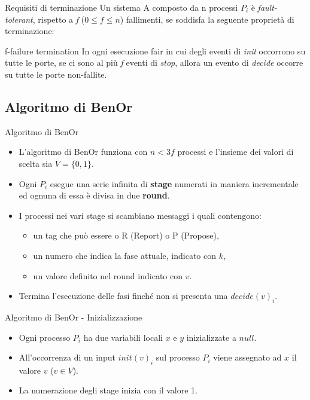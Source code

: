 \documentclass{beamer}
\begin{document}
\begin{frame}{Requisiti di terminazione}
    Un sistema A composto da n processi $P_{i}$ è \textit{fault-tolerant}, rispetto a \textit{f} ($0 \leq f \leq n$) fallimenti, se soddisfa la seguente proprietà di terminazione: 
    \begin{block}{f-failure termination}
    In ogni esecuzione fair in cui degli eventi di \textit{init} occorrono su tutte le porte, se ci sono al più \textit{f} eventi di \textit{stop}, allora un evento di \textit{decide} occorre su tutte le porte non-fallite. 
    \end{block}
\end{frame}


\subsection{Algoritmo di BenOr}
\begin{frame}{Algoritmo di BenOr}
    \begin{itemize}
        \item L'algoritmo di BenOr funziona con $n < 3f$ processi e l'insieme dei valori di scelta sia $V = \{0, 1\}$.
        
        \item Ogni $P_{i}$ esegue una serie infinita di \textbf{stage} numerati in maniera incrementale ed ognuna di essa è divisa in due \textbf{round}.
        
        \item I processi nei vari stage si scambiano messaggi i quali contengono:
            \begin{itemize}
                \item un tag che può essere o R (Report) o P (Propose),
                \item un numero che indica la fase attuale, indicato con $k$,
                \item un valore definito nel round indicato con $v$.
            \end{itemize}
            
        \item Termina l'esecuzione delle fasi finché non si presenta una $decide(v)_{i}$.
    \end{itemize}
\end{frame}

\begin{frame}{Algoritmo di BenOr - Inizializzazione}
    \begin{itemize}
        \item Ogni processo $P_{i}$ ha due variabili locali $x$ e $y$ inizializzate a $null$. 
        
        \item All'occorrenza di un input $init(v)_{i}$ sul processo $P_{i}$ viene assegnato ad $x$ il valore $v$ ($v \in V$).
        
        \item La numerazione degli stage inizia con il valore 1.
    \end{itemize}
\end{frame}
\end{document}
